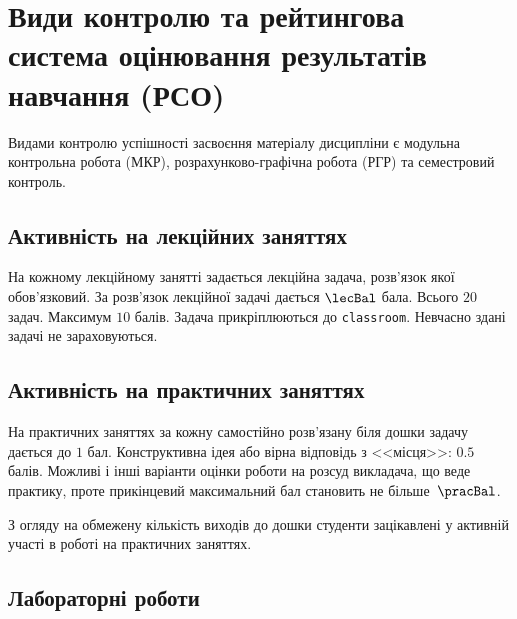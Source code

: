 \documentclass{Syllabus}
\begin{document}
\section{Види контролю та рейтингова система оцінювання результатів навчання (РСО)}

%

Видами контролю успішності засвоєння матеріалу дисципліни є  модульна контрольна робота (МКР), розрахунково-графічна робота (РГР) та семестровий контроль.

\subsection*{Активність на лекційних заняттях}
На кожному лекційному занятті задається лекційна задача, роз\-в'язок якої обов'язковий. За роз\-в'язок лекційної задачі дається $\lecBal$ бала. Всього $ 20 $ задач. Максимум $ 10 $ балів. Задача прикріплюються до \texttt{classroom}. Невчасно здані задачі не зараховуються.

\subsection*{Активність на практичних заняттях}

На практичних заняттях за кожну самостійно розв’язану біля дошки задачу дається до $1$ бал. Конструктивна ідея або вірна відповідь з <<місця>>: $0.5$ балів. Можливі і інші варіанти оцінки роботи на розсуд викладача, що веде практику, проте прикінцевий максимальний бал становить не більше~$\pracBal$.

З огляду на обмежену кількість виходів до дошки студенти зацікавлені у активній участі в роботі на практичних заняттях.

\subsection*{Лабораторні роботи}
\end{document}

